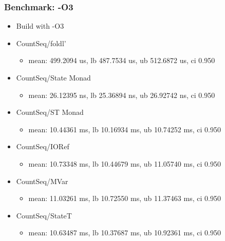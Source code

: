 \begin{frame}\frametitle{Benchmark: -O3}

\begin{itemize}
\item
  Build with -O3
\item
  CountSeq/foldl'

  \begin{itemize}
  \item
    mean: 499.2094 us, lb 487.7534 us, ub 512.6872 us, ci 0.950
  \end{itemize}
\item
  CountSeq/State Monad

  \begin{itemize}
  \item
    mean: 26.12395 ns, lb 25.36894 ns, ub 26.92742 ns, ci 0.950
  \end{itemize}
\item
  CountSeq/ST Monad

  \begin{itemize}
  \item
    mean: 10.44361 ms, lb 10.16934 ms, ub 10.74252 ms, ci 0.950
  \end{itemize}
\item
  CountSeq/IORef

  \begin{itemize}
  \item
    mean: 10.73348 ms, lb 10.44679 ms, ub 11.05740 ms, ci 0.950
  \end{itemize}
\item
  CountSeq/MVar

  \begin{itemize}
  \item
    mean: 11.03261 ms, lb 10.72550 ms, ub 11.37463 ms, ci 0.950
  \end{itemize}
\item
  CountSeq/StateT

  \begin{itemize}
  \item
    mean: 10.63487 ms, lb 10.37687 ms, ub 10.92361 ms, ci 0.950
  \end{itemize}
\end{itemize}

\end{frame}
